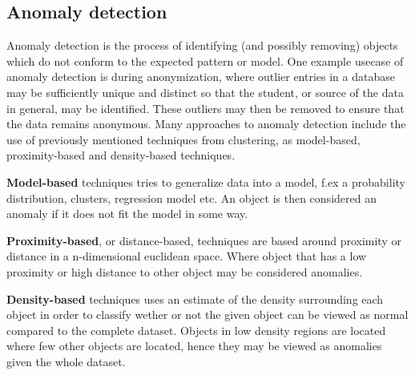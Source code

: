 \subsection{Anomaly detection}
	Anomaly detection is the process of identifying (and possibly removing) objects which do not conform to the expected pattern or model. 
	One example usecase of anomaly detection is during anonymization, 
	where outlier entries in a database may be sufficiently unique and distinct so that the student, or source of the data in general, may be identified. 
	These outliers may then be removed to ensure that the data remains anonymous.
	Many approaches to anomaly detection include the use of previously mentioned techniques from clustering, 
	as model-based, proximity-based and density-based techniques. 
	
	\bigskip\noindent
	\textbf{Model-based} techniques tries to generalize data into a model, 
	f.ex a probability distribution, clusters, regression model etc. 
	An object is then considered an anomaly if it does not fit the model in some way. 
	
	\bigskip\noindent
	\textbf{Proximity-based}, or distance-based, techniques are based around proximity or distance in a n-dimensional euclidean space. 
	Where object that has a low proximity or high distance to other object may be considered anomalies.
	
	\bigskip\noindent
	\textbf{Density-based} techniques uses an estimate of the density surrounding each object in order to classify wether or not the given object can be viewed as normal compared to the complete dataset. Objects in low density regions are located where few other objects are located, hence they may be viewed as anomalies given the whole dataset.
	
